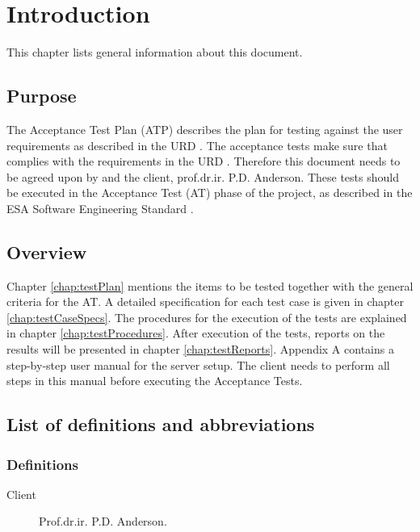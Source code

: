\chapter{Introduction}
\label{chap:intro}
This chapter lists general information about this document.

\section{Purpose}
\label{sec:purpose}
The Acceptance Test Plan (ATP) describes the plan for testing \projectname{} against the user requirements as described in the URD \cite{urd}. The acceptance tests make sure that
\projectname{} complies with the requirements in the URD \cite{urd}. Therefore this document needs to be agreed upon by \projectauthor{} and the client, prof.dr.ir. P.D. Anderson.
These tests should be executed in the Acceptance Test (AT) phase of the \projectname{} project, as described in the ESA Software Engineering Standard \cite{esa}.

\section{Overview}
\label{sec:overview}
Chapter \ref{chap:testPlan} mentions the items to be tested together with the general criteria for the AT. A detailed specification for each test case is given in chapter \ref{chap:testCaseSpecs}. The procedures for the execution of the tests are explained in chapter \ref{chap:testProcedures}. After execution of the tests, reports on the results will be presented in chapter \ref{chap:testReports}.
Appendix A contains a step-by-step user manual for the server setup. The client needs to perform all steps in this manual before executing the Acceptance Tests.

\section{List of definitions and abbreviations}
\label{sec:listofdef}

\subsection{Definitions}
\label{subsec:def}

\begin{description}
\item[Client] Prof.dr.ir. P.D. Anderson.
\end{description}

